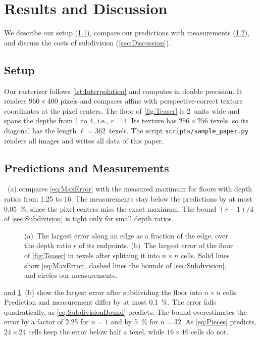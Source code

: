 \section{Results and Discussion}\label{sec:Results}
We describe our setup (\cref{sec:Setup}), compare our predictions with measurements (\cref{sec:Measurements}), and discuss the costs of subdivision (\cref{sec:Discussion}).

\subsection{Setup}\label{sec:Setup}
Our rasterizer follows \cref{lst:Interpolation} and computes in double precision.
It renders $960\times400$ pixels and compares affine with perspective-correct texture coordinates at the pixel centers.
The floor of \cref{fig:Teaser} is 2~units wide and spans the depths from 1 to 4, i.e., $r = 4$.
Its texture has $256\times256$ texels, so its diagonal has the length $\ell = 362$~texels.
The script \texttt{scripts/sample\_paper.py} renders all images and writes all data of this paper.

\subsection{Predictions and Measurements}\label{sec:Measurements}
~(a) compares \cref{eq:MaxError} with the measured maximum for floors with depth ratios from 1.25 to 16.
The measurements stay below the predictions by at most \qty{0.05}{\percent}, since the pixel centers miss the exact maximum.
The bound $(r - 1)/4$ of \cref{sec:Subdivision} is tight only for small depth ratios.

\begin{figure}[t]
    \centering
    
    \caption{
        (a)~The largest error along an edge as a fraction of the edge, over the depth ratio $r$ of its endpoints.
        (b)~The largest error of the floor of \cref{fig:Teaser} in texels after splitting it into $n\times n$ cells.
        Solid lines show \cref{eq:MaxError}, dashed lines the bounds of \cref{sec:Subdivision}, and circles our measurements.
    }
    \label{fig:Plots}
\end{figure}

 and \cref{fig:Plots}~(b) show the largest error after subdividing the floor into $n\times n$ cells.
Prediction and measurement differ by at most \qty{0.1}{\percent}.
The error falls quadratically, as \cref{eq:SubdivisionBound} predicts.
The bound overestimates the error by a factor of 2.25 for $n = 1$ and by \qty{5}{\percent} for $n = 32$.
As \cref{eq:Pieces} predicts, $24\times24$ cells keep the error below half a texel, while $16\times16$ cells do not.

